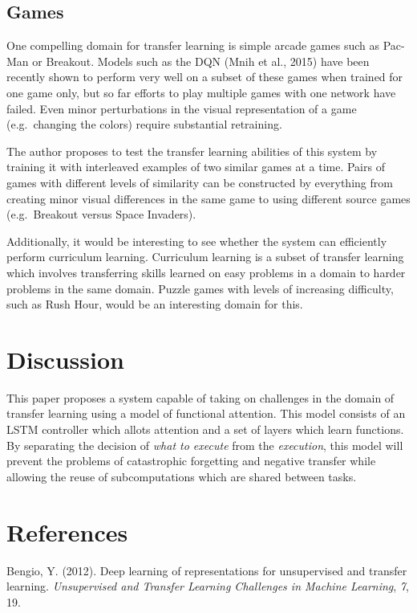 \documentclass[]{article}
\begin{document}
\subsection{Games}\label{games}

One compelling domain for transfer learning is simple arcade games such
as Pac-Man or Breakout. Models such as the DQN (Mnih et al., 2015) have
been recently shown to perform very well on a subset of these games when
trained for one game only, but so far efforts to play multiple games
with one network have failed. Even minor perturbations in the visual
representation of a game (e.g.~changing the colors) require substantial
retraining.

The author proposes to test the transfer learning abilities of this
system by training it with interleaved examples of two similar games at
a time. Pairs of games with different levels of similarity can be
constructed by everything from creating minor visual differences in the
same game to using different source games (e.g.~Breakout versus Space
Invaders).

Additionally, it would be interesting to see whether the system can
efficiently perform curriculum learning. Curriculum learning is a subset
of transfer learning which involves transferring skills learned on easy
problems in a domain to harder problems in the same domain. Puzzle games
with levels of increasing difficulty, such as Rush Hour, would be an
interesting domain for this.

\section{Discussion}\label{discussion}

This paper proposes a system capable of taking on challenges in the
domain of transfer learning using a model of functional attention. This
model consists of an LSTM controller which allots attention and a set of
layers which learn functions. By separating the decision of \emph{what
to execute} from the \emph{execution}, this model will prevent the
problems of catastrophic forgetting and negative transfer while allowing
the reuse of subcomputations which are shared between tasks.

\section*{References}\label{references}

Bengio, Y. (2012). Deep learning of representations for unsupervised and
transfer learning. \emph{Unsupervised and Transfer Learning Challenges
in Machine Learning}, \emph{7}, 19.
\end{document}
